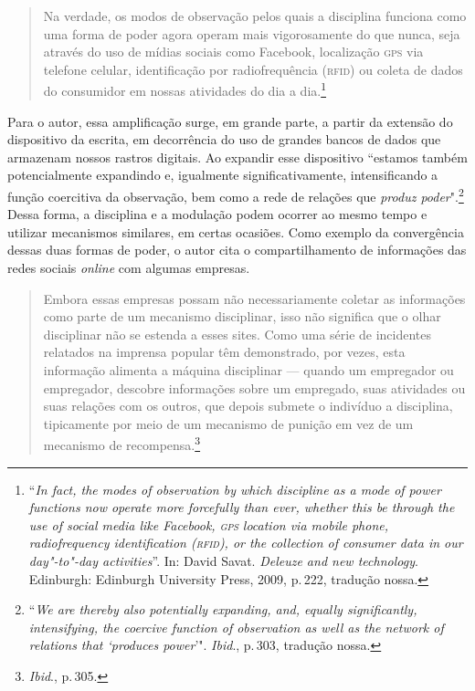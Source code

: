 \begin{quote}
Na verdade, os modos de observação pelos quais a disciplina funciona
como uma forma de poder agora operam mais vigorosamente do que nunca,
seja através do uso de mídias sociais como Facebook, localização \textsc{gps} via
telefone celular, identificação por radiofrequência (\textsc{rfid}) ou coleta de
dados do consumidor em nossas atividades do dia a dia.\footnote{``\textit{In
  fact, the modes of observation by which discipline as a mode of power
  functions now operate more forcefully than ever, whether this be
  through the use of social media like Facebook, \textsc{gps} location via mobile
  phone, radiofrequency identification (\textsc{rfid}), or the collection of
  consumer data in our day"-to"-day activities}''. In: David Savat. \textit{Deleuze and new technology}. Edinburgh: Edinburgh University Press, 2009, p.\,222, tradução nossa.} 
\end{quote}

Para o autor, essa amplificação surge, em grande parte, a partir da
extensão do dispositivo da escrita, em decorrência do uso de grandes
bancos de dados que armazenam nossos rastros digitais. Ao expandir esse
dispositivo ``estamos também potencialmente expandindo e, igualmente
significativamente, intensificando a função coercitiva da observação,
bem como a rede de relações que \textit{produz poder}".\footnote{``\textit{We are
  thereby also potentially expanding, and, equally significantly,
  intensifying, the coercive function of observation as well as the
  network of relations that `produces power}'". \textit{Ibid}., p.\,303, tradução nossa.}
Dessa forma, a disciplina e a modulação podem ocorrer ao mesmo tempo e
utilizar mecanismos similares, em certas ocasiões. Como exemplo da
convergência dessas duas formas de poder, o autor cita o
compartilhamento de informações das redes sociais \textit{online} com algumas
empresas.

\begin{quote}
Embora essas empresas possam não necessariamente coletar as informações
como parte de um mecanismo disciplinar, isso não significa que o olhar
disciplinar não se estenda a esses sites. Como uma série de incidentes
relatados na imprensa popular têm demonstrado, por vezes, esta
informação alimenta a máquina disciplinar --- quando um empregador ou
empregador, descobre informações sobre um empregado, suas atividades ou
suas relações com os outros, que depois submete o indivíduo a
disciplina, tipicamente por meio de um mecanismo de punição em vez de um
mecanismo de recompensa.\footnote{\textit{Ibid}., p.\,305.}
\end{quote}


